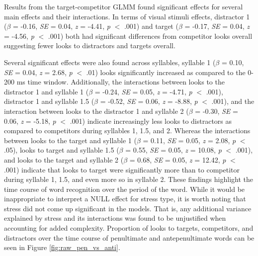 Results from the target-competitor GLMM found significant effects for several main effects and their interactions. In terms of visual stimuli effects, distractor 1 ($\beta$ = -0.16, \textit{SE} = 0.04, \textit{z} = -4.41, \textit{p} $<$ .001) and target ($\beta$ = -0.17, \textit{SE} = 0.04, \textit{z} = -4.56, \textit{p} $<$ .001) both had significant differences from competitor looks overall suggesting fewer looks to distractors and targets overall. 

Several significant effects were also found across syllables, syllable 1 ($\beta$ = 0.10, \textit{SE} = 0.04, \textit{z} = 2.68, \textit{p} $<$ .01) looks significantly increased as compared to the 0-200 ms time window. Additionally, the interactions between looks to the distractor 1 and syllable 1 ($\beta$ = -0.24, \textit{SE} = 0.05, \textit{z} = -4.71, \textit{p} $<$ .001), distractor 1 and syllable 1.5 ($\beta$ = -0.52, \textit{SE} = 0.06, \textit{z} = -8.88, \textit{p} $<$ .001), and the interaction between looks to the distractor 1 and syllable 2 ($\beta$ = -0.30, \textit{SE} = 0.06, \textit{z} = -5.18, \textit{p} $<$ .001) indicate increasingly less looks to distractors as compared to competitors during syllables 1, 1.5, and 2. Whereas the interactions between looks to the target and syllable 1 ($\beta$ = 0.11, \textit{SE} = 0.05, \textit{z} = 2.08, \textit{p} $<$ .05), looks to target and syllable 1.5 ($\beta$ = 0.55, \textit{SE} = 0.05, \textit{z} = 10.08, \textit{p} $<$ .001), and looks to the target and syllable 2 ($\beta$ = 0.68, \textit{SE} = 0.05, \textit{z} = 12.42, \textit{p} $<$ .001) indicate that looks to target were significantly more than to competitor during syllable 1, 1.5, and even more so in syllable 2. These findings highlight the time course of word recognition over the period of the word. While it would be inappropriate to interpret a NULL effect for stress type, it is worth noting that stress did not come up significant in the models. That is, any additional variance explained by stress and its interactions was found to be unjustified when accounting for added complexity. Proportion of looks to targets, competitors, and distractors over the time course of penultimate and antepenultimate words can be seen in Figure \ref{fig:raw_pen_vs_anti}.

